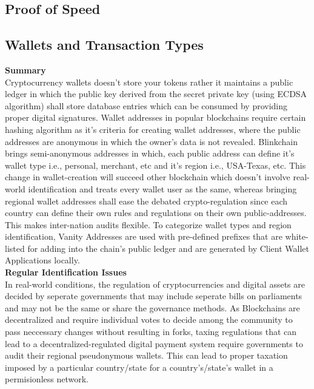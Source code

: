 \documentclass[letterpaper,11pt]{article}
\begin{document}
\subsection{Proof of Speed}


\subsection{Wallets and Transaction Types}

\textbf{Summary}\\

Cryptocurrency wallets doesn't store your tokens rather it maintains a public ledger in which the public key derived from the secret private key (using ECDSA algorithm) shall store database entries which can be consumed by providing proper digital signatures. Wallet addresses in popular blockchains require certain hashing algorithm as it's criteria for creating wallet addresses, where the public addresses are anonymous in which the owner's data is not revealed. Blinkchain brings semi-anonymous addresses in which, each public address can define it's wallet type i.e., personal, merchant, etc and it's region i.e., USA-Texas, etc. This change in wallet-creation will succeed other blockchain which doesn't involve real-world identification and treats every wallet user as the same, whereas bringing regional wallet addresses shall ease the debated crypto-regulation since each country can define their own rules and regulations on their own public-addresses. This makes inter-nation audits flexible. To categorize wallet types and region identification, Vanity Addresses are used with pre-defined prefixes that are white-listed for adding into the chain's public ledger and are generated by Client Wallet Applications locally.\\

\textbf{Regular Identification Issues}\\

In real-world conditions, the regulation of cryptocurrencies and digital assets are decided by seperate governments that may include seperate bills on parliaments and may not be the same or share the governance methods. As Blockchains are decentralized and require individual votes to decide among the community to pass neccessary changes without resulting in forks, taxing regulations that can lead to a decentralized-regulated digital payment system require governments to audit their regional pseudonymous wallets. This can lead to proper taxation imposed by a particular country/state for a country's/state's wallet in a permisionless network.\\
\end{document}
